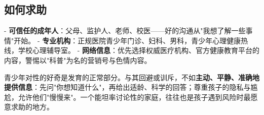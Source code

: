 \subsection{如何求助}

- \textbf{可信任的成年人}：父母、监护人、老师、校医——好的沟通从"我想了解一些事情"开始。
- \textbf{专业机构}：正规医院青少年门诊、妇科、男科，青少年心理健康热线，学校心理辅导室。
- \textbf{网络信息}：优先选择权威医疗机构、官方健康教育平台的内容，警惕以"科普"为名的营销号与色情内容。

\begin{tcolorbox}[colback=blue!5!white,colframe=blue!70!black,title=给家长与教育者]
青少年对性的好奇是发育的正常部分。与其回避或训斥，不如\textbf{主动、平静、准确地提供信息}：先问"你想知道什么"，再给出适龄、科学的回答；尊重孩子的隐私与尴尬，允许他们"慢慢来"。一个能坦率讨论性的家庭，往往也是孩子遇到风险时最愿意求助的地方。
\end{tcolorbox}
